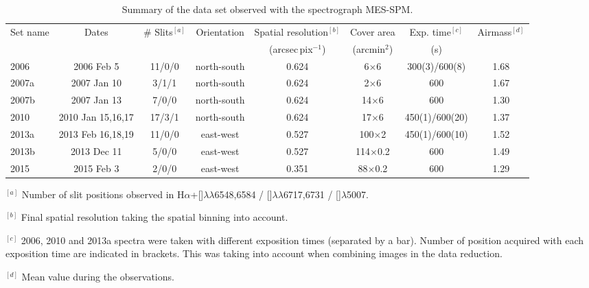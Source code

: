 \documentclass[a4paper,fleqn,usenatbib]{mnras}     %
\newcommand{\Ha} {H$\alpha$}      		%
\newcommand{\NII} {[\ion{N}{ii}]}            %
\newcommand{\SII} {[\ion{S}{ii}]}             %
\newcommand{\OIII} {[\ion{O}{iii}]}          %
\begin{document}
\begin{table}
\caption{Summary of the data set observed with the spectrograph MES-SPM.} 
\label{table:logSPM} 
\centering 
\begin{tabular}{l c c c c c c c }
\hline

Set name  &           Dates     & \# Slits$^{[a]}$  & Orientation   & Spatial resolution$^{[b]}$ &  Cover area       & Exp. time$^{[c]}$ &  Airmass$^{[d]}$ \\
          &                     &                   &               &    (arcsec\,pix$^{-1}$)    & (arcmin$^{2}$)    &      (s)          &                  \\
\hline
2006      &  2006 Feb 5         &    11/0/0         &  north-south   &              0.624         &  6$\times$6       & 300(3)/600(8)     &      1.68        \\
2007a     &  2007 Jan 10        &    3/1/1          &  north-south   &              0.624         &  2$\times$6       &       600         &      1.67        \\
2007b     &  2007 Jan 13        &    7/0/0          &  north-south   &              0.624         &  14$\times$6      &       600         &      1.30        \\
2010      &  2010 Jan 15,16,17  &    17/3/1         &  north-south   &              0.624         &  17$\times$6      &  450(1)/600(20)   &      1.37        \\
2013a     &  2013 Feb 16,18,19  &    11/0/0         &  east-west   &              0.527         &  100$\times$2     &  450(1)/600(10)   &      1.52        \\            
2013b     &  2013 Dec 11        &    5/0/0          &  east-west   &              0.527         &  114$\times$0.2   &          600      &      1.49        \\
2015      &  2015 Feb 3         &    2/0/0          &  east-west   &              0.351         &  88$\times$0.2    &          600      &      1.29        \\
\hline
\end{tabular}
\begin{list}{}{}\footnotesize{
\item $^{[a]}$ Number of slit positions observed in \Ha+\NII$\lambda\lambda$6548,6584 / \SII$\lambda\lambda$6717,6731 /  \OIII$\lambda$5007.
\item $^{[b]}$ Final spatial resolution taking the spatial binning into account.
\item $^{[c]}$ 2006, 2010 and 2013a spectra were taken with different exposition times (separated by a bar). Number of position acquired with each exposition 
time are indicated in brackets. This was taking into account when combining images in the data reduction.
\item $^{[d]}$ Mean value during the observations.
}
\end{list}
\end{table}
\end{document}
